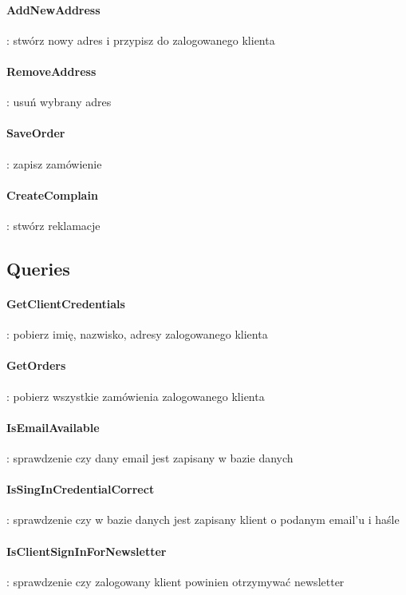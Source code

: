 \documentclass[12pt]{report}
\begin{document}
				\paragraph{AddNewAddress} : stwórz nowy adres i przypisz do zalogowanego klienta
				
				\paragraph{RemoveAddress} : usuń wybrany adres
				
				\paragraph{SaveOrder} : zapisz zamówienie
				
				\paragraph{CreateComplain} : stwórz reklamacje
				
		\subsection{Queries}
			
				\paragraph{GetClientCredentials} : pobierz imię, nazwisko, adresy zalogowanego klienta
				
				\paragraph{GetOrders} : pobierz wszystkie zamówienia zalogowanego klienta 
		
				\paragraph{IsEmailAvailable} : sprawdzenie czy dany email jest zapisany w bazie danych
	
				\paragraph{IsSingInCredentialCorrect} : sprawdzenie czy w bazie danych jest zapisany klient o podanym email’u i haśle
		
				\paragraph{IsClientSignInForNewsletter} : sprawdzenie czy zalogowany klient powinien otrzymywać newsletter
			
\end{document}
